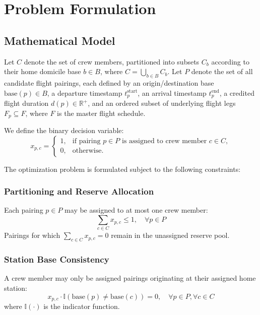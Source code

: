 \documentclass[journal]{IEEEtran}
\begin{document}
\section{Problem Formulation}

\subsection{Mathematical Model}

Let $C$ denote the set of crew members, partitioned into subsets $C_b$ according to their home domicile base $b \in B$, where $C = \bigcup_{b \in B} C_b$. Let $P$ denote the set of all candidate flight pairings, each defined by an origin/destination base $\text{base}(p) \in B$, a departure timestamp $t^{\text{start}}_p$, an arrival timestamp $t^{\text{end}}_p$, a credited flight duration $d(p) \in \mathbb{R}^+$, and an ordered subset of underlying flight legs $F_p \subseteq F$, where $F$ is the master flight schedule.

We define the binary decision variable:
\begin{equation}
x_{p,c} = \begin{cases} 
1, & \text{if pairing } p \in P \text{ is assigned to crew member } c \in C, \\
0, & \text{otherwise.}
\end{cases}
\end{equation}

The optimization problem is formulated subject to the following constraints:

\subsubsection{Partitioning and Reserve Allocation}
Each pairing $p \in P$ may be assigned to at most one crew member:
\begin{equation}
\sum_{c \in C} x_{p,c} \le 1, \quad \forall p \in P
\end{equation}
Pairings for which $\sum_{c \in C} x_{p,c} = 0$ remain in the unassigned reserve pool.

\subsubsection{Station Base Consistency}
A crew member may only be assigned pairings originating at their assigned home station:
\begin{equation}
x_{p,c} \cdot \mathbb{I}(\text{base}(p) \ne \text{base}(c)) = 0, \quad \forall p \in P, \forall c \in C
\end{equation}
where $\mathbb{I}(\cdot)$ is the indicator function.
\end{document}
